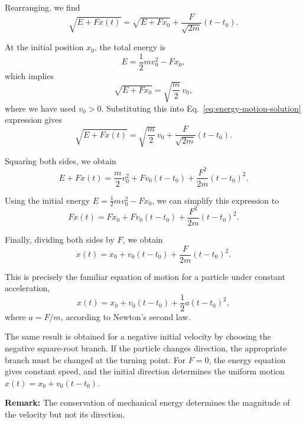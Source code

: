 \documentclass[../main.tex]{subfiles}
\begin{document}
Rearranging, we find
\begin{equation}
    \sqrt{E+Fx(t)}
    =
    \sqrt{E+Fx_0}
    +\frac{F}{\sqrt{2m}}(t-t_0).
    \label{eq:energy-motion-solution}
\end{equation}

At the initial position $x_0$, the total energy is
\begin{equation}
    E = \frac{1}{2}mv_0^2-Fx_0,
\end{equation}
which implies
\begin{equation}
    \sqrt{E+Fx_0}
    = \sqrt{\frac{m}{2}}\,v_0,
\end{equation}
where we have used $v_0>0$. Substituting this into Eq.~\eqref{eq:energy-motion-solution} expression gives
\begin{equation}
    \sqrt{E+Fx(t)}
    =
    \sqrt{\frac{m}{2}}\,v_0
    +\frac{F}{\sqrt{2m}}(t-t_0).
\end{equation}

Squaring both sides, we obtain
\begin{equation}
    E+Fx(t)
    =
    \frac{m}{2}v_0^2
    +Fv_0(t-t_0)
    +\frac{F^2}{2m}(t-t_0)^2.
\end{equation}

Using the initial energy
$E=\frac{1}{2}mv_0^2-Fx_0$,
we can simplify this expression to
\begin{equation}
    Fx(t)
    =
    Fx_0+Fv_0(t-t_0)
    +\frac{F^2}{2m}(t-t_0)^2.
\end{equation}

Finally, dividing both sides by $F$, we obtain
\begin{equation}
    \boxed{
    x(t)=x_0+v_0(t-t_0)
    +\frac{F}{2m}(t-t_0)^2
    }.
\end{equation}

This is precisely the familiar equation of motion for a particle under constant acceleration,
\begin{equation}
    x(t)=x_0+v_0(t-t_0)
    +\frac{1}{2}a(t-t_0)^2,
\end{equation}
where $a=F/m$, according to Newton's second law.

The same result is obtained for a negative initial velocity by choosing the negative square-root branch. If the particle changes direction, the appropriate branch must be changed at the turning point. For $F=0$, the energy equation gives constant speed, and the initial direction determines the uniform motion
$x(t)=x_0+v_0(t-t_0)$.

\textbf{Remark:}
The conservation of mechanical energy determines the magnitude of the velocity but not its direction.
\end{document}
